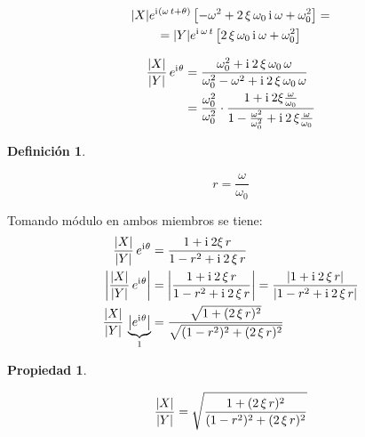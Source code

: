 \documentclass[a5paper,12pt,twoside]{book}
\newtheorem{defn}{{Definición}}[chapter]
\newtheorem{prop}{{Propiedad}}[chapter]
\begin{document}
\begin{multline*}
    {\left| {X} \right|} e^{\mathrm{i}\mkern1mu (\omega \, t + \theta)} \left[ -\omega^2 + 2 \, \xi \, \omega_0 \, \mathrm{i}\mkern1mu \, \omega + \omega_0^2  \right] =
    \\
    = {\left| {Y} \right|} e^{\mathrm{i}\mkern1mu \, \omega \, t} \left[ 2 \, \xi \, \omega_0 \, \mathrm{i}\mkern1mu \, \omega + \omega_0^2 \right]
\end{multline*}

\begin{align*}
    \frac{{\left| {X} \right|}}{{\left| {Y} \right|}} \, e^{\mathrm{i}\mkern1mu\theta}
    &= \frac{\omega_0^2 + \mathrm{i}\mkern1mu \, 2 \, \xi \, \omega_0 \, \omega}{\omega_0^2 - \omega^2 + \mathrm{i}\mkern1mu \, 2 \, \xi \, \omega_0 \, \omega}
    \\
    &= \frac{\omega_0^2}{\omega_0^2} \cdot \frac{1+ \mathrm{i}\mkern1mu \, 2 \xi \frac{\omega}{\omega_0}}{1-\frac{\omega^2}{\omega_0^2} + \mathrm{i}\mkern1mu \, 2 \, \xi \frac{\omega}{\omega_0}}
\end{align*}

\begin{mdframed}[style=MyFrame1]
    \begin{defn}
    \end{defn}
    \begin{equation*}
        r=\frac{\omega}{\omega_0}
    \end{equation*}
\end{mdframed}

Tomando módulo en ambos miembros se tiene:
\begin{align*}
    \frac{{\left| {X} \right|}}{{\left| {Y} \right|}} \, e^{\mathrm{i}\mkern1mu\theta}
    &= \frac{1+ \mathrm{i}\mkern1mu \, 2 \xi \, r}{1-r^2 + \mathrm{i}\mkern1mu \, 2 \, \xi \, r}
    \\
    {\left| {\frac{{\left| {X} \right|}}{{\left| {Y} \right|}} \, e^{\mathrm{i}\mkern1mu\theta}} \right|}
    &= {\left| {\frac{1+ \mathrm{i}\mkern1mu \, 2 \, \xi \, r}{1-r^2 + \mathrm{i}\mkern1mu \, 2 \, \xi \, r}} \right|}
    = \frac{{\left| {1 + \mathrm{i}\mkern1mu \, 2 \, \xi \, r} \right|}}{{\left| {1-r^2 + \mathrm{i}\mkern1mu \, 2 \, \xi \, r} \right|}}
    \\
    \frac{{\left| {X} \right|}}{{\left| {Y} \right|}} \, \underbrace{{\left| {e^{\mathrm{i}\mkern1mu\theta}} \right|}}_1
    &= \frac{\sqrt{1 + (2 \, \xi \, r)^2}}{\sqrt{(1-r^2)^2 + (2 \, \xi \, r)^2}}
\end{align*}

\begin{mdframed}[style=MyFrame1]
    \begin{prop}
    \end{prop}
    \begin{equation*}
        \frac{{\left| {X} \right|}}{{\left| {Y} \right|}} = \sqrt{\frac{1 + (2 \, \xi \, r)^2}{(1-r^2)^2 + (2 \, \xi \, r)^2}}
    \end{equation*}
\end{mdframed}
\end{document}

